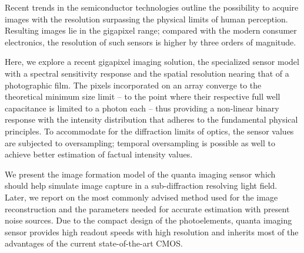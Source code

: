 Recent trends in the semiconductor technologies outline the possibility to acquire images with the resolution surpassing the physical limits of human perception. Resulting images lie in the gigapixel range; compared with the modern consumer electronics, the resolution of such sensors is higher by three orders of magnitude. 

Here, we explore a recent gigapixel imaging solution, the specialized sensor model with a  spectral sensitivity response and the spatial resolution nearing that of a photographic film. The pixels incorporated on an array converge to the theoretical minimum size limit -- to the point where their respective full well capacitance is limited to a photon each -- thus providing a non-linear binary response with the intensity distribution that adheres to the fundamental physical principles. To accommodate for the diffraction limits of optics, the sensor values are subjected to oversampling; temporal oversampling is possible as well to achieve better estimation of factual intensity values.

We present the image formation model of the quanta imaging sensor which should help simulate image capture in a sub-diffraction resolving light field. Later, we report on the most commonly advised method used for the image reconstruction and the parameters needed for accurate estimation with present noise sources. Due to the compact design of the photoelements, quanta imaging sensor provides high readout speeds with high resolution and inherits most of the advantages of the current state-of-the-art CMOS.


